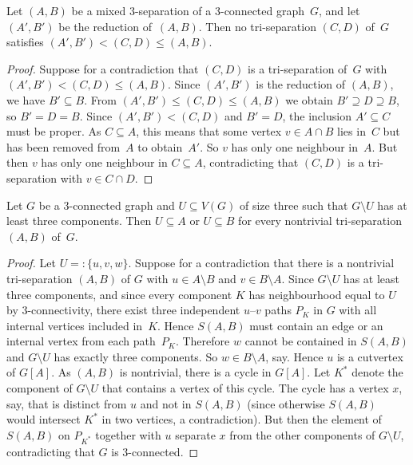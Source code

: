 \documentclass{aic}
\newcommand{\se}{\subseteq}
\theoremstyle{plain}
\theoremstyle{definition}
\theoremstyle{plain}
\theoremstyle{plain}
\newcommand{\sm}{\setminus}
\renewcommand{\le}{\leqslant}
\begin{document}
\begin{lem}\label{obs321}
Let $(A,B)$ be a mixed 3-separation of a 3-connected graph~$G$, and let $(A',B')$ be the reduction of~$(A,B)$.
Then no tri-separation $(C,D)$ of~$G$ satisfies $(A',B')<(C,D)\le (A,B)$.
\end{lem}
\begin{proof}
Suppose for a contradiction that $(C,D)$ is a tri-separation of~$G$ with $(A',B')< (C,D)\le (A,B)$.
Since $(A',B')$ is the reduction of $(A,B)$, we have $B'\se B$.
From $(A',B')\le (C,D)\le (A,B)$ we obtain $B'\supseteq D\supseteq B$, so $B'=D=B$.
Since $(A',B')<(C,D)$ and $B'=D$, the inclusion $A'\se C$ must be proper.
As $C\se A$, this means that some vertex $v\in A\cap B$ lies in~$C$ but has been removed from~$A$ to obtain~$A'$.
So $v$ has only one neighbour in~$A$.
But then $v$ has only one neighbour in $C\se A$, contradicting that $(C,D)$ is a tri-separation with $v\in C\cap D$.
\end{proof}

\begin{lem}\label{ThreeCompsTriBlock}
Let $G$ be a 3-connected graph and $U\se V(G)$ of size three such that $G\sm U$ has at least three components.
Then $U\se A$ or $U\se B$ for every nontrivial tri-separation $(A,B)$ of~$G$.
\end{lem}
\begin{proof}
Let $U=:\{u,v,w\}$.
Suppose for a contradiction that there is a nontrivial tri-separation $(A,B)$ of $G$ with $u\in A\sm B$ and $v\in B\sm A$.
Since $G\sm U$ has at least three components, and since every component $K$ has neighbourhood equal to $U$ by 3-connectivity, there exist three independent $u$--$v$ paths $P_K$ in $G$ with all internal vertices included in~$K$.
Hence $S(A,B)$ must contain an edge or an internal vertex from each path~$P_K$.
Therefore $w$ cannot be contained in $S(A,B)$ and $G\sm U$ has exactly three components.
So $w\in B\sm A$, say.
Hence $u$ is a cutvertex of $G[A]$.
As $(A,B)$ is nontrivial, there is a cycle in $G[A]$.
Let $K^*$ denote the component of $G\sm U$ that contains a vertex of this cycle.
The cycle has a vertex $x$, say, that is distinct from $u$ and not in $S(A,B)$ (since otherwise $S(A,B)$ would intersect $K^*$ in two vertices, a contradiction).
But then the element of $S(A,B)$ on $P_{K^*}$ together with $u$ separate $x$ from the other components of $G\sm U$, contradicting that $G$ is 3-connected.
\end{proof}
\end{document}
